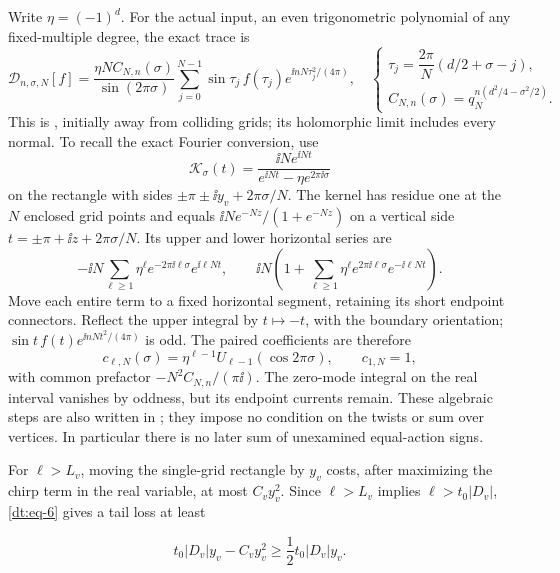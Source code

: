 Write \(\eta=(-1)^d\). For the actual input, an even trigonometric
polynomial of any fixed-multiple degree, the exact trace is
\begin{equation}\label{dt:trace-grid}
 \mathcal D_{n,\sigma,N}[f]
 =\frac{\eta N C_{N,n}(\sigma)}{\sin(2\pi\sigma)}
   \sum_{j=0}^{N-1}\sin\tau_j\,f(\tau_j)
                      e^{\ii nN\tau_j^2/(4\pi)},
 \quad\begin{cases}
 \tau_j=\dfrac{2\pi}{N}(d/2+\sigma-j),\\
 C_{N,n}(\sigma)=q_N^{n(d^2/4-\sigma^2/2)}.
 \end{cases}
\end{equation}
This is \cite[equation~(6.4)]{Meridian}, initially away from colliding
grids; its holomorphic limit includes every normal. To recall the exact
Fourier conversion, use
\[
 \mathcal K_\sigma(t)=
 \frac{\ii N e^{\ii Nt}}{e^{\ii Nt}-\eta e^{2\pi\ii\sigma}}
\]
on the rectangle with sides \(\pm\pi\pm\ii y_v+2\pi\sigma/N\).
The kernel has residue one at the \(N\) enclosed grid points and equals
\(\ii N e^{-Nz}/(1+e^{-Nz})\) on a vertical side
\(t=\pm\pi+\ii z+2\pi\sigma/N\). Its upper and lower horizontal
series are
\[
 -\ii N\sum_{\ell\ge1}\eta^\ell
       e^{-2\pi\ii\ell\sigma}e^{\ii\ell Nt},\qquad
 \ii N\left(1+\sum_{\ell\ge1}\eta^\ell
       e^{2\pi\ii\ell\sigma}e^{-\ii\ell Nt}\right).
\]
Move each entire term to a fixed horizontal segment, retaining its short
endpoint connectors. Reflect the upper integral by \(t\mapsto-t\),
with the boundary orientation; \(\sin t\,f(t)e^{\ii nNt^2/(4\pi)}\)
is odd. The paired coefficients are therefore
\begin{equation}\label{dt:eq-39}
 c_{\ell,N}(\sigma)=\eta^{\ell-1}
 U_{\ell-1}(\cos2\pi\sigma),\qquad c_{1,N}=1,
\end{equation}
with common prefactor \(-N^2C_{N,n}/(\pi\ii)\).
The zero-mode integral on the real interval vanishes by oddness, but its
endpoint currents remain. These algebraic steps are also written in
\cite[Section~6.1]{Summed}; they impose no condition on the twists or
sum over vertices. In particular there is no later sum of unexamined
equal-action signs.

For \(\ell>L_v\), moving the single-grid rectangle by \(y_v\) costs, after
maximizing the chirp term in the real variable, at most \(C_v y_v^2\).
Since \(\ell>L_v\) implies \(\ell>t_0|D_v|\), \eqref{dt:eq-6} gives a tail loss at least

\begin{equation}\label{dt:eq-40}
t_0|D_v|y_v-C_vy_v^2\ge\frac12t_0|D_v|y_v.
\end{equation}

